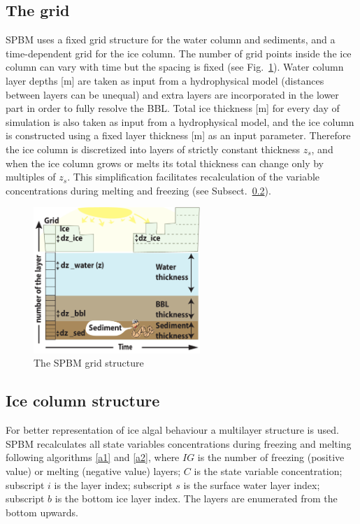 \documentclass[gmd, manuscript]{copernicus}
\begin{document}
\subsection{The grid}
\label{subsec:Grid}

\textrm{SPBM} uses a fixed grid structure for the water column and sediments, and a time-dependent grid for the ice column.
The number of grid points inside the ice column can vary with time but the spacing is fixed (see Fig.~\ref{fig:grid}).
Water column layer depths [\unit{m}] are taken as input from a hydrophysical model (distances between layers can be unequal) and extra layers are incorporated in the lower part in order to fully resolve the \textrm{BBL}.
Total ice thickness [\unit{m}] for every day of simulation is also taken as input from a hydrophysical model, and the ice column is constructed using a fixed layer thickness [\unit{m}] as an input parameter.
Therefore the ice column is discretized into layers of strictly constant thickness $z_{s}$, and when the ice column grows or melts its total thickness can change only by multiples of $z_{s}$.
This simplification facilitates recalculation of the variable concentrations during melting and freezing (see Subsect.~\ref{subsec:Ice}).

\begin{figure}[htbp]
\includegraphics[width=6.3cm]{fig01}
\caption{The \textrm{SPBM} grid structure}
\label{fig:grid}
\end{figure}

\subsection{Ice column structure}
\label{subsec:Ice}
For better representation of ice algal behaviour a multilayer structure is used.
\textrm{SPBM} recalculates all state variables concentrations during freezing and melting following algorithms \ref{a1} and \ref{a2}, where $IG$ is the number of freezing (positive value) or melting (negative value) layers;
$C$ is the state variable concentration;
subscript $i$ is the layer index;
subscript $s$ is the surface water layer index;
subscript $b$ is the bottom ice layer index.
The layers are enumerated from the bottom upwards.
\end{document}
